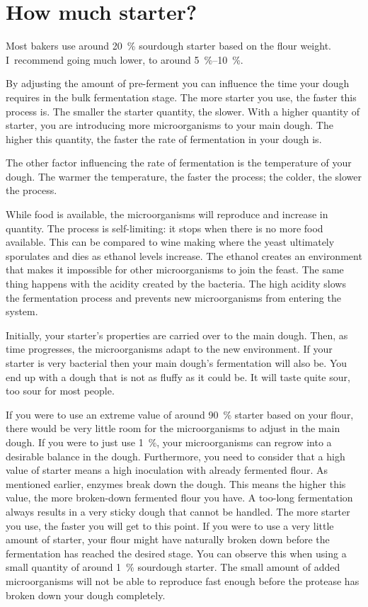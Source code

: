 \section{How much starter?}

Most bakers use around \qty{20}{\percent} sourdough starter based on the
flour weight.  I~recommend going much lower, to around
\qtyrange{5}{10}{\percent}.

By adjusting the amount of pre-ferment you can influence the time your dough
requires in the bulk fermentation stage. The more starter you use, the faster
this process is. The smaller the starter quantity, the slower. With a higher
quantity of starter, you are introducing more microorganisms to your main
dough. The higher this quantity, the faster the rate of fermentation in your
dough is.

The other factor influencing the rate of fermentation is the temperature of
your dough. The warmer the temperature, the faster the process; the colder, the
slower the process.

While food is available, the microorganisms will reproduce and increase in
quantity. The process is self-limiting: it stops when there is no
more food available. This can be compared to wine making where
the yeast ultimately sporulates and dies as ethanol levels increase. The ethanol creates an
environment that makes it impossible for other
microorganisms to join the feast. The same thing happens with the acidity
created by the bacteria. The high acidity slows the fermentation process and
prevents new microorganisms from entering the system.

Initially, your starter's properties are carried over to the main dough. Then,
as time progresses, the microorganisms adapt to the new environment. If your
starter is very bacterial then your main dough's fermentation will also be. You
end up with a dough that is not as fluffy as it could be. It will taste quite
sour, too sour for most people.

If you were to use an extreme value of around \qty{90}{\percent} starter based on your flour, there
would be very little room for the microorganisms to adjust in the main dough.
If you were to just use \qty{1}{\percent}, your microorganisms can regrow into a
desirable balance in the dough. Furthermore, you need to consider that a high value
of starter means a high inoculation with already fermented flour. As
mentioned earlier, enzymes break down the dough. This means the higher this
value, the more broken-down fermented flour you have. A too-long fermentation
always results in a very sticky dough that cannot be handled. The more
starter you use, the faster you will get to this point. If you were to use a
very little amount of starter, your flour might have naturally broken down
before the fermentation has reached the desired stage. You can observe this
when using a small quantity of around \qty{1}{\percent} sourdough starter. The small
amount of added microorganisms will not be able to reproduce fast enough
before the protease has broken down your dough completely.

